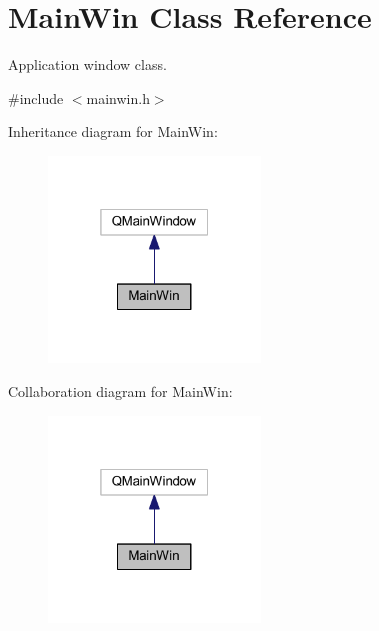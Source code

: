 \hypertarget{class_main_win}{\section{Main\-Win Class Reference}
\label{class_main_win}
}


Application window class.  




{\ttfamily \#include $<$mainwin.\-h$>$}



Inheritance diagram for Main\-Win\-:\nopagebreak
\begin{figure}[H]
\begin{center}
\leavevmode
\includegraphics[width=160pt]{class_main_win__inherit__graph}
\end{center}
\end{figure}


Collaboration diagram for Main\-Win\-:\nopagebreak
\begin{figure}[H]
\begin{center}
\leavevmode
\includegraphics[width=160pt]{class_main_win__coll__graph}
\end{center}
\end{figure}
